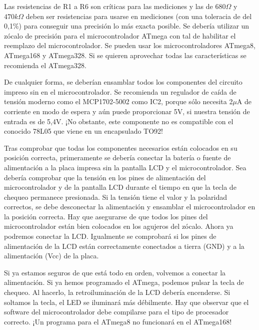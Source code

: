 Las  resistencias de  R1 a  R6 son  críticas para  las mediciones  y las  de \(680\Omega\)  y \(470k\Omega\)  deben ser
resistencias para usarse  en mediciones (con una  toleracia de del 0,1\%)  para conseguir una precisión  lo más exacta
posible. Se debería utilizar un zócalo de precisión para el microcontrolador ATmega con tal de habilitar el reemplazo
del microcontrolador.  Se pueden usar los  microcontroladores ATmega8, ATmega168  y ATmega328. Si se  quieren aprovechar
todas las características se recomienda el ATmega328.

De cualquier  forma, se deberían ensamblar  todos los componentes del  circuito impreso sin en  el microcontrolador. Se
recomienda un regulador de caída de tensión moderno como  el MCP1702-5002 como IC2, porque sólo necesita 2\(\mu\)A de
corriente en modo de espera y aún puede proporcionar 5V, si nuestra tensión de entrada es de 5,4V. ¡No obstante, este
componente no es compatible con el conocido 78L05 que viene en un encapsulado TO92!

Tras comprobar que todas los componentes necesarios están  colocados en su posición correcta, primeramente se debería
conectar la  batería o  fuente de  alimentación a  la placa impresa  sin la  pantalla LCD  y el  microcontrolador. Sea
debería comprobar que  la tensión en los pines de  alimentación del microcontrolador y de la  pantalla LCD durante el
tiempo en que la tecla de chequeo permanece presionada. Si  la tensión tiene el valor y la polaridad correctos, se debe
desconectar la alimentación y  ensamblar el microcontrolador en la posición correcta. Hay  que asegurarse de que todos
los pines del  microcontrolador están bien colocados  en los agujeros del  zócalo. Ahora ya podremos  conectar la LCD.
Igualmente se comprobará si los pines de alimentación de la  LCD están correctamente conectados a tierra (GND) y a la
alimentación (Vcc) de la placa.

Si ya  estamos seguros de  que está  todo en orden,  volvemos a conectar  la alimentación.  Si ya hemos  programado el
ATmega, podemos pulsar la tecla de chequeo. Al hacerlo,  la retroiluminación de la LCD debería encenderse. Si soltamos
la tecla, el LED se  iluminará más débilmente. Hay que observar que el  software del microcontrolador debe compilarse
para el tipo de procesador correcto. ¡Un programa para el ATmega8 no funcionará en el ATmega168!


